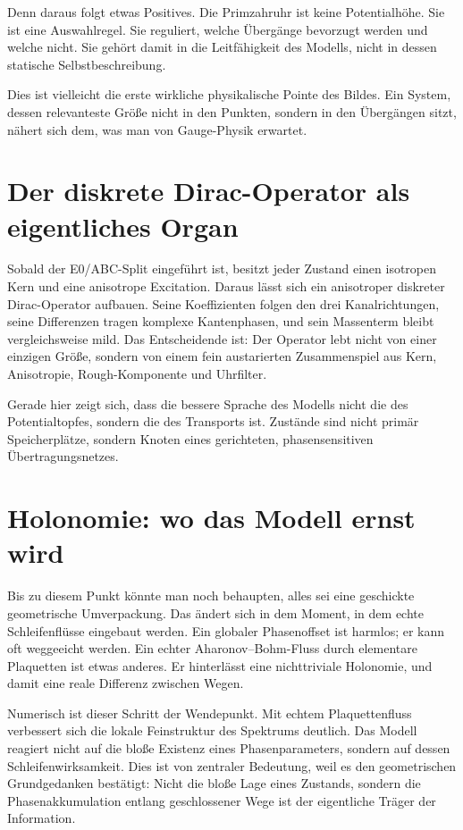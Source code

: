 \documentclass[11pt,a4paper]{article}
\theoremstyle{remark}
\begin{document}
	Denn daraus folgt etwas Positives. Die Primzahruhr ist keine Potentialhöhe. Sie ist eine Auswahlregel. Sie reguliert, welche Übergänge bevorzugt werden und welche nicht. Sie gehört damit in die Leitfähigkeit des Modells, nicht in dessen statische Selbstbeschreibung.
	
	Dies ist vielleicht die erste wirkliche physikalische Pointe des Bildes. Ein System, dessen relevanteste Größe nicht in den Punkten, sondern in den Übergängen sitzt, nähert sich dem, was man von Gauge-Physik erwartet.
	
	\section{Der diskrete Dirac-Operator als eigentliches Organ}
	
	Sobald der E0/ABC-Split eingeführt ist, besitzt jeder Zustand einen isotropen Kern und eine anisotrope Excitation. Daraus lässt sich ein anisotroper diskreter Dirac-Operator aufbauen. Seine Koeffizienten folgen den drei Kanalrichtungen, seine Differenzen tragen komplexe Kantenphasen, und sein Massenterm bleibt vergleichsweise mild. Das Entscheidende ist: Der Operator lebt nicht von einer einzigen Größe, sondern von einem fein austarierten Zusammenspiel aus Kern, Anisotropie, Rough-Komponente und Uhrfilter.
	
	Gerade hier zeigt sich, dass die bessere Sprache des Modells nicht die des Potentialtopfes, sondern die des Transports ist. Zustände sind nicht primär Speicherplätze, sondern Knoten eines gerichteten, phasensensitiven Übertragungsnetzes.
	
	\section{Holonomie: wo das Modell ernst wird}
	
	Bis zu diesem Punkt könnte man noch behaupten, alles sei eine geschickte geometrische Umverpackung. Das ändert sich in dem Moment, in dem echte Schleifenflüsse eingebaut werden. Ein globaler Phasenoffset ist harmlos; er kann oft weggeeicht werden. Ein echter Aharonov--Bohm-Fluss durch elementare Plaquetten ist etwas anderes. Er hinterlässt eine nichttriviale Holonomie, und damit eine reale Differenz zwischen Wegen.
	
	Numerisch ist dieser Schritt der Wendepunkt. Mit echtem Plaquettenfluss verbessert sich die lokale Feinstruktur des Spektrums deutlich. Das Modell reagiert nicht auf die bloße Existenz eines Phasenparameters, sondern auf dessen Schleifenwirksamkeit. Dies ist von zentraler Bedeutung, weil es den geometrischen Grundgedanken bestätigt: Nicht die bloße Lage eines Zustands, sondern die Phasenakkumulation entlang geschlossener Wege ist der eigentliche Träger der Information.
	
\end{document}
